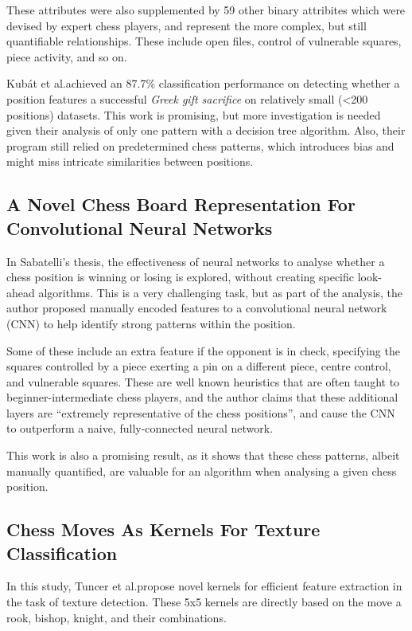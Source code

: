 These attributes were also supplemented by 59 other binary attribites which
were devised by expert chess players, and represent the more complex, but still
quantifiable relationships.\cite{middlegamePatterns} These include open files,
control of vulnerable squares, piece activity, and so on.

Kub\'{a}t et al.\@ achieved an 87.7\% classification performance on detecting
whether a position features a successful \emph{Greek gift sacrifice} on
relatively small (<200 positions) datasets. This work is promising, but more
investigation is needed given their analysis of only one pattern with a
decision tree algorithm. Also, their program still relied on predetermined
chess patterns, which introduces bias and might miss intricate similarities
between positions.

\subsection{A Novel Chess Board Representation For Convolutional Neural Networks}

In Sabatelli's thesis,\cite{chessCNN} the effectiveness of neural networks to
analyse whether a chess position is winning or losing is explored, without
creating specific look-ahead algorithms. This is a very challenging task, but
as part of the analysis, the author proposed manually encoded features to a
convolutional neural network (CNN) to help identify strong patterns within the
position. 

Some of these include an extra feature if the opponent is in check, specifying
the squares controlled by a piece exerting a pin on a different piece, centre
control, and vulnerable squares.\cite{chessCNN} These are well known
heuristics that are often taught to beginner-intermediate chess players, and
the author claims that these additional layers are ``extremely representative
of the chess positions'', and cause the CNN to outperform a naive,
fully-connected neural network.

This work is also a promising result, as it shows that these chess patterns,
albeit manually quantified, are valuable for an algorithm when analysing a
given chess position.

\subsection{Chess Moves As Kernels For Texture Classification}

In this study, Tuncer et al.\@ propose novel kernels for efficient feature
extraction in the task of texture detection.\cite{chessKernel} These 5x5
kernels are directly based on the move a rook, bishop, knight, and their
combinations. 

